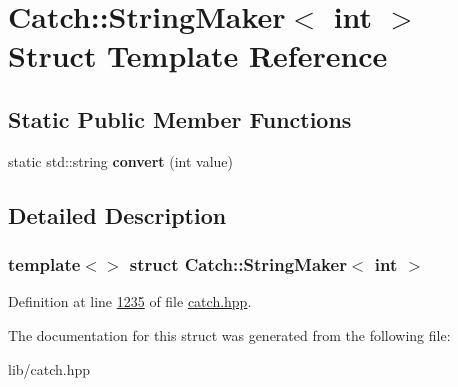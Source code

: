 \hypertarget{structCatch_1_1StringMaker_3_01int_01_4}{}\section{Catch\+::String\+Maker$<$ int $>$ Struct Template Reference}
\label{structCatch_1_1StringMaker_3_01int_01_4}
\subsection*{Static Public Member Functions}
\begin{DoxyCompactItemize}
\item 
\mbox{\label{structCatch_1_1StringMaker_3_01int_01_4_aab096e55fb7283f6ad47b5ca277e22e8}} 
static std\+::string {\bfseries convert} (int value)
\end{DoxyCompactItemize}


\subsection{Detailed Description}
\subsubsection*{template$<$$>$\newline
struct Catch\+::\+String\+Maker$<$ int $>$}



Definition at line \mbox{\hyperlink{catch_8hpp_source_l01235}{1235}} of file \mbox{\hyperlink{catch_8hpp_source}{catch.\+hpp}}.



The documentation for this struct was generated from the following file\+:\begin{DoxyCompactItemize}
\item 
lib/catch.\+hpp\end{DoxyCompactItemize}
